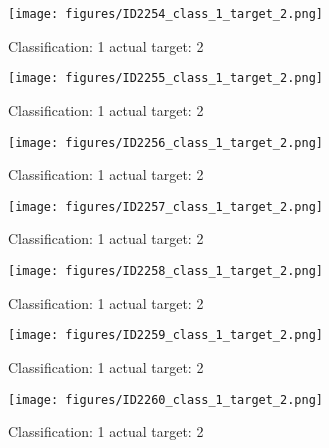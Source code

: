\begin{figure}[h!]
\begin{center}
\texttt{[image: figures/ID2254\_class\_1\_target\_2.png]}
\end{center}
\caption{ Classification: 1 actual target: 2}
\label{fig:ID2254_class_1_target_2}
\end{figure}
\begin{figure}[h!]
\begin{center}
\texttt{[image: figures/ID2255\_class\_1\_target\_2.png]}
\end{center}
\caption{ Classification: 1 actual target: 2}
\label{fig:ID2255_class_1_target_2}
\end{figure}
\begin{figure}[h!]
\begin{center}
\texttt{[image: figures/ID2256\_class\_1\_target\_2.png]}
\end{center}
\caption{ Classification: 1 actual target: 2}
\label{fig:ID2256_class_1_target_2}
\end{figure}
\begin{figure}[h!]
\begin{center}
\texttt{[image: figures/ID2257\_class\_1\_target\_2.png]}
\end{center}
\caption{ Classification: 1 actual target: 2}
\label{fig:ID2257_class_1_target_2}
\end{figure}
\begin{figure}[h!]
\begin{center}
\texttt{[image: figures/ID2258\_class\_1\_target\_2.png]}
\end{center}
\caption{ Classification: 1 actual target: 2}
\label{fig:ID2258_class_1_target_2}
\end{figure}
\begin{figure}[h!]
\begin{center}
\texttt{[image: figures/ID2259\_class\_1\_target\_2.png]}
\end{center}
\caption{ Classification: 1 actual target: 2}
\label{fig:ID2259_class_1_target_2}
\end{figure}
\begin{figure}[h!]
\begin{center}
\texttt{[image: figures/ID2260\_class\_1\_target\_2.png]}
\end{center}
\caption{ Classification: 1 actual target: 2}
\label{fig:ID2260_class_1_target_2}
\end{figure}
